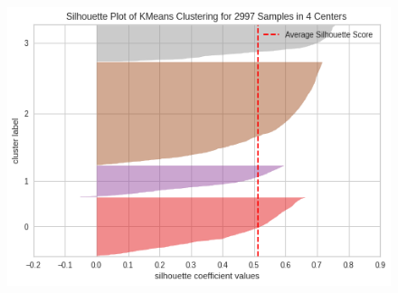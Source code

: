 \begin{figure}[!htb]
\begin{minipage}{.32\textwidth}
		\includegraphics[width=\linewidth]{plots/kmeans/kmeans_silhouette_average}
		\label{fig:kmeans_silhouette_average}
	\end{minipage}
\end{figure}

